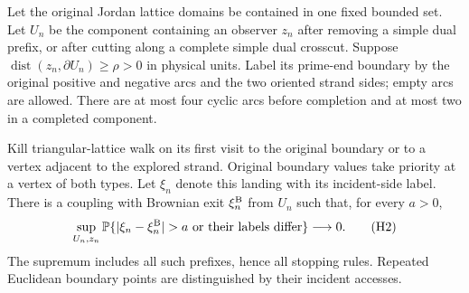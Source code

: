 \begin{lemma}\label{h:slit-sampling}
Let the original Jordan lattice domains be contained in one fixed
bounded set. Let $U_n$ be the component containing an observer $z_n$
after removing a simple dual prefix, or after cutting along a
complete simple dual crosscut. Suppose
$\operatorname{dist}(z_n,\partial U_n)\ge\rho>0$ in physical units.
Label its prime-end boundary by the original positive and negative
arcs and the two oriented strand sides; empty arcs are allowed.
There are at most four cyclic arcs before completion and at most
two in a completed component.

Kill triangular-lattice walk on its first visit to the original
boundary or to a vertex adjacent to the explored strand. Original
boundary values take priority at a vertex of both types.
Let $\xi_n$ denote this landing with its incident-side label.
There is a coupling with Brownian exit $\xi_n^{\rm B}$ from $U_n$
such that, for every $a>0$,
\[
 \sup_{U_n,z_n}
 \Prob\{|\xi_n-\xi_n^{\rm B}|>a
           \text{ or their labels differ}\}\longrightarrow0 .
 \tag{H2}
\]
The supremum includes all such prefixes, hence all stopping rules.
Repeated Euclidean boundary points are distinguished by their
incident accesses.
\end{lemma}
